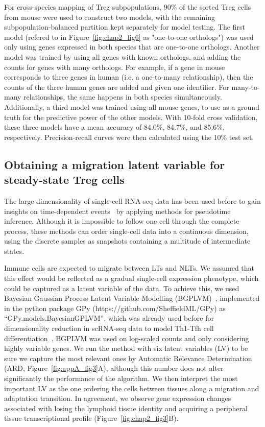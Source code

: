 For cross-species mapping of Treg subpopulations, 90\% of the sorted Treg cells from mouse were used to construct two models, with the remaining subpopulation-balanced partition kept separately for model testing. The first model (refered to in Figure~\ref{fig:chap2_fig6} as "one-to-one orthologs") was used only using genes expressed in both species that are one-to-one orthologs. Another model was trained by using all genes with known orthologs, and adding the counts for genes with many orthologs. For example, if a gene in mouse corresponds to three genes in human (i.e. a one-to-many relationship), then the counts of the three human genes are added and given one identifier. For many-to-many relationships, the same happens in both species simultaneously. Additionally, a third model was trained using all mouse genes, to use as a ground truth for the predictive power of the other models. With 10-fold cross validation, these three models have a mean accuracy of 84.0\%, 84.7\%, and 85.6\%, respectively. Precision-recall curves were then calculated using the 10\% test set.

\subsection{Obtaining a migration latent variable for steady-state Treg cells}
The large dimensionality of single-cell RNA-seq data has been used before to gain insights on time-dependent events~\citep{trapnell_dynamics_2014,lonnberg_single-cell_2017} by applying methods for pseudotime inference. Although it is impossible to follow one cell through the complete process, these methods can order single-cell data into a continuous dimension, using the discrete samples as snapshots containing a multitude of intermediate states.

Immune cells are expected to migrate between LTs and NLTs. We assumed that this effect would be reflected as a gradual single-cell expression phenotype, which could be captured as a latent variable of the data. To achieve this, we used Bayesian Gaussian Process Latent Variable Modelling (BGPLVM)~\citep{Michalis_K_Titsias2010-na}, implemented in the python package GPy (https://github.com/SheffieldML/GPy) as “GPy.models.BayesianGPLVM”, which was already used before for dimensionality reduction in scRNA-seq data to model Th1-Tfh cell differentiation~\citep{lonnberg_single-cell_2017}. BGPLVM was used on log-scaled counts and only considering highly variable genes. We run the method with six latent variables (LV) to be sure we capture the most relevant ones by Automatic Relevance Determination (ARD, Figure~\ref{fig:appA_fig3}A), although this number does not alter significantly the performance of the algorithm. We then interpret the most important LV as the one ordering the cells between tissues along a migration and adaptation transition. In agreement, we observe gene expression changes associated with losing the lymphoid tissue identity and acquiring a peripheral tissue transcriptional profile (Figure~\ref{fig:chap2_fig3}B).

